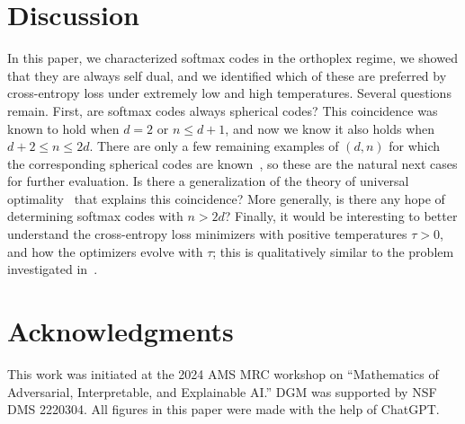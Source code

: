 \documentclass{article}
\theoremstyle{plain}
\theoremstyle{definition}
\begin{document}
\section{Discussion}
\label{sec.discussion}

In this paper, we characterized softmax codes in the orthoplex regime, we showed that they are always self dual, and we identified which of these are preferred by cross-entropy loss under extremely low and high temperatures.
Several questions remain.
First, are softmax codes always spherical codes?
This coincidence was known to hold when $d=2$ or $n\leq d+1$, and now we know it also holds when $d+2\leq n \leq 2d$.
There are only a few remaining examples of $(d,n)$ for which the corresponding spherical codes are known~\cite{EricsonZ:01}, so these are the natural next cases for further evaluation.
Is there a generalization of the theory of universal optimality~\cite{CohnK:07} that explains this coincidence?
More generally, is there any hope of determining softmax codes with $n>2d$?
Finally, it would be interesting to better understand the cross-entropy loss minimizers with positive temperatures $\tau>0$, and how the optimizers evolve with $\tau$; this is qualitatively similar to the problem investigated in~\cite{ChenGGKO:20}.


\section*{Acknowledgments}

This work was initiated at the 2024 AMS MRC workshop on ``Mathematics of Adversarial, Interpretable, and Explainable AI.''
DGM was supported by NSF DMS 2220304. 
All figures in this paper were made with the help of ChatGPT.
\end{document}
